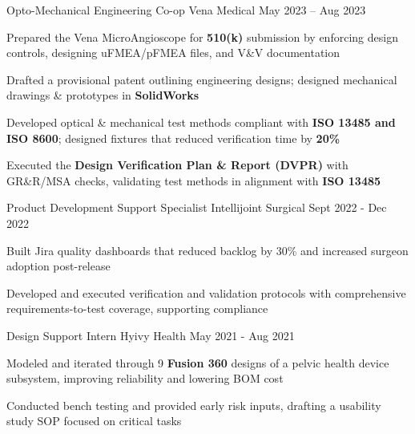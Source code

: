 \documentclass[11pt, a4paper]{russell}
\begin{document}
\begin{cventries}
\cventry
  {Opto-Mechanical Engineering Co-op} %
  {Vena Medical} %
  {} %
  {May 2023 -- Aug 2023} %
  {
    \begin{cvitems}
        \item {Prepared the Vena MicroAngioscope for \textbf{510(k)} submission by enforcing design controls, designing uFMEA/pFMEA files, and V\&V documentation}
        \item {Drafted a provisional patent outlining engineering designs; designed mechanical drawings \& prototypes in \textbf{SolidWorks}}
        \item {Developed optical \& mechanical test methods compliant with \textbf{ISO 13485 and ISO 8600}; designed fixtures that reduced verification time by \textbf{20\%}}
        \item {Executed the \textbf{Design Verification Plan \& Report (DVPR)} with GR\&R/MSA checks, validating test methods in alignment with \textbf{ISO 13485}}
    \end{cvitems}
  }

\cventry
  {Product Development Support Specialist} %
  {Intellijoint Surgical} %
  {} %
  {Sept 2022 - Dec 2022} %
  {
    \begin{cvitems}
        \item {Built Jira quality dashboards that reduced backlog by 30\% and increased surgeon adoption post-release}
        \item {Developed and executed verification and validation protocols with comprehensive requirements-to-test coverage, supporting compliance}
    \end{cvitems}
  }

\cventry
  {Design Support Intern} %
  {Hyivy Health} %
  {} %
  {May 2021 - Aug 2021} %
  {
    \begin{cvitems}
        \item {Modeled and iterated through 9 \textbf{Fusion 360} designs of a pelvic health device subsystem, improving reliability and lowering BOM cost}
        \item {Conducted bench testing and provided early risk inputs, drafting a usability study SOP focused on critical tasks}
    \end{cvitems}
  }
\end{cventries}
\end{document}
